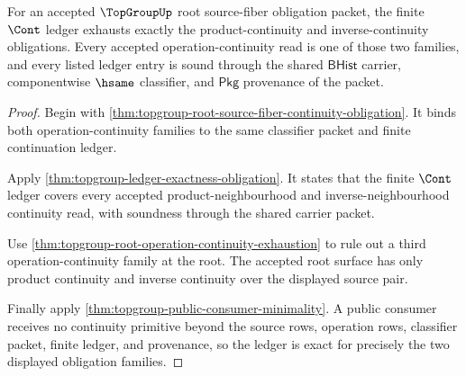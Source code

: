 \begin{theorem}
\label{thm:topgroup-root-source-fiber-ledger-exactness}
For an accepted $\TopGroupUp$ root source-fiber obligation packet, the finite
$\Cont$ ledger exhausts exactly the product-continuity and inverse-continuity
obligations. Every accepted operation-continuity read is one of those two
families, and every listed ledger entry is sound through the shared
$\mathsf{BHist}$ carrier, componentwise $\hsame$ classifier, and
$\mathsf{Pkg}$ provenance of the packet.
\end{theorem}
\begin{proof}
Begin with
\autoref{thm:topgroup-root-source-fiber-continuity-obligation}. It binds both
operation-continuity families to the same classifier packet and finite
continuation ledger.

Apply \autoref{thm:topgroup-ledger-exactness-obligation}. It states that the
finite $\Cont$ ledger covers every accepted product-neighbourhood and
inverse-neighbourhood continuity read, with soundness through the shared
carrier packet.

Use \autoref{thm:topgroup-root-operation-continuity-exhaustion} to rule out a
third operation-continuity family at the root. The accepted root surface has
only product continuity and inverse continuity over the displayed source pair.

Finally apply \autoref{thm:topgroup-public-consumer-minimality}. A public
consumer receives no continuity primitive beyond the source rows, operation
rows, classifier packet, finite ledger, and provenance, so the ledger is exact
for precisely the two displayed obligation families.
\end{proof}
